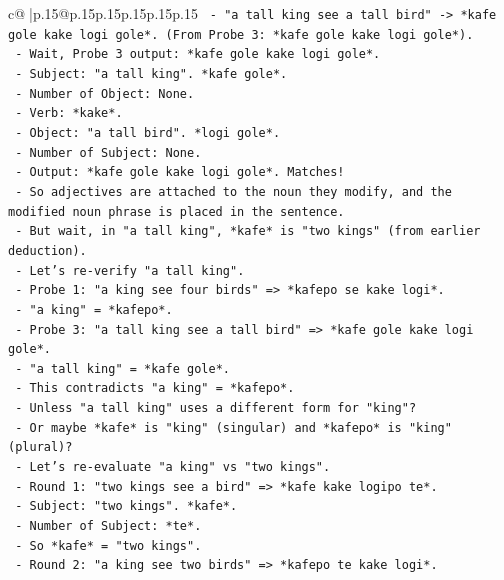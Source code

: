 \documentclass{article}
\begin{document}
{\begin{supertabular}{c@{$\;$}|p{.15\linewidth}@{}p{.15\linewidth}p{.15\linewidth}p{.15\linewidth}p{.15\linewidth}p{.15\linewidth}}
{{{\texttt{        {-} "a tall king see a tall bird" {-}> *kafe gole kake logi gole*. (From Probe 3: *kafe gole kake logi gole*).} \\
\texttt{        {-} Wait, Probe 3 output: *kafe gole kake logi gole*.} \\
\texttt{          {-} Subject: "a tall king". *kafe gole*.} \\
\texttt{          {-} Number of Object: None.} \\
\texttt{          {-} Verb: *kake*.} \\
\texttt{          {-} Object: "a tall bird". *logi gole*.} \\
\texttt{          {-} Number of Subject: None.} \\
\texttt{          {-} Output: *kafe gole kake logi gole*. Matches!} \\
\texttt{        {-} So adjectives are attached to the noun they modify, and the modified noun phrase is placed in the sentence.} \\
\texttt{        {-} But wait, in "a tall king", *kafe* is "two kings" (from earlier deduction).} \\
\texttt{        {-} Let's re{-}verify "a tall king".} \\
\texttt{        {-} Probe 1: "a king see four birds" => *kafepo se kake logi*.} \\
\texttt{          {-} "a king" = *kafepo*.} \\
\texttt{        {-} Probe 3: "a tall king see a tall bird" => *kafe gole kake logi gole*.} \\
\texttt{          {-} "a tall king" = *kafe gole*.} \\
\texttt{          {-} This contradicts "a king" = *kafepo*.} \\
\texttt{          {-} Unless "a tall king" uses a different form for "king"?} \\
\texttt{          {-} Or maybe *kafe* is "king" (singular) and *kafepo* is "king" (plural)?} \\
\texttt{          {-} Let's re{-}evaluate "a king" vs "two kings".} \\
\texttt{          {-} Round 1: "two kings see a bird" => *kafe kake logipo te*.} \\
\texttt{            {-} Subject: "two kings". *kafe*.} \\
\texttt{            {-} Number of Subject: *te*.} \\
\texttt{            {-} So *kafe* = "two kings".} \\
\texttt{          {-} Round 2: "a king see two birds" => *kafepo te kake logi*.} \\
}}}
\end{supertabular}}
\end{document}
